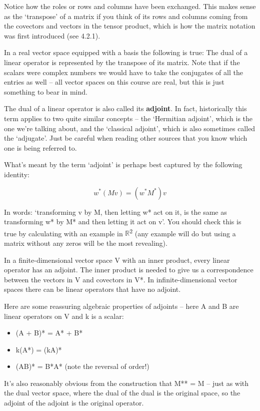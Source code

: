 \documentclass[oneside,english]{amsbook}
\numberwithin{section}{chapter}
\theoremstyle{plain}
\theoremstyle{definition}
\begin{document}
Notice how the roles or rows and columns have been exchanged. This makes
sense as the `transpose' of a matrix if you think of its rows and
columns coming from the covectors and vectors in the tensor product,
which is how the matrix notation was first introduced (see 4.2.1).

In a real vector space equipped with a basis the following is true: The
dual of a linear operator is represented by the transpose of its matrix.
Note that if the scalars were complex numbers we would have to take the
conjugates of all the entries as well -- all vector spaces on this
course are real, but this is just something to bear in mind.

The dual of a linear operator is also called its \textbf{adjoint}. In
fact, historically this term applies to two quite similar concepts --
the `Hermitian adjoint', which is the one we're talking about, and the
`classical adjoint', which is also sometimes called the `adjugate'.
Just be careful when reading other sources that you know which one is
being referred to.

What's meant by the term `adjoint' is perhaps best captured by the
following identity:

\[w^{*}(Mv) = \left( w^{*}M^{*} \right)v\]

In words: `transforming v by M, then letting w* act on it, is the same
as transforming w* by M* and then letting it act on v'. You should
check this is true by calculating with an example in
$\mathbb{R}$\textsuperscript{2} (any example will do but using a matrix
without any zeros will be the most revealing).

In a finite-dimensional vector space V with an inner product, every
linear operator has an adjoint. The inner product is needed to give us a
correspondence between the vectors in V and covectors in V*. In
infinite-dimensional vector spaces there can be linear operators that
have no adjoint.

Here are some reassuring algebraic properties of adjoints -- here A and
B are linear operators on V and k is a scalar:

\begin{itemize}
	\item
	(A + B)* = A* + B*
	\item
	k(A*) = (kA)*
	\item
	(AB)* = B*A* (note the reversal of order!)
\end{itemize}

It's also reasonably obvious from the construction that M** = M -- just
as with the dual vector space, where the dual of the dual is the
original space, so the adjoint of the adjoint is the original operator.
\end{document}
